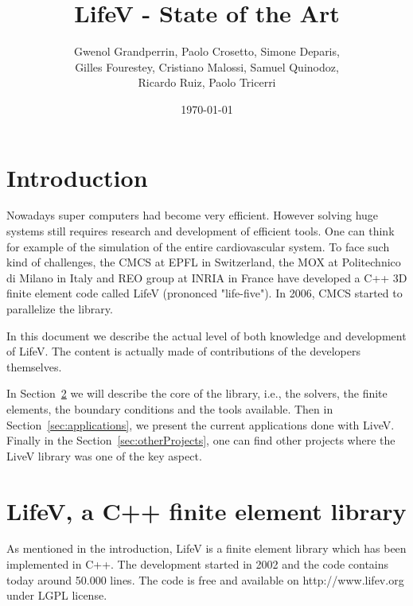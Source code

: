 \documentclass[11pt]{article}
\begin{document}
\title{LifeV - State of the Art}
\author{Gwenol Grandperrin, Paolo Crosetto, Simone Deparis,\\
	Gilles Fourestey, Cristiano Malossi, Samuel Quinodoz, \\
	Ricardo Ruiz, Paolo Tricerri}
\date{\today}
\maketitle
\tableofcontents

\section{Introduction}
Nowadays super computers had become very efficient. However solving huge systems still requires research and development of efficient tools. One can think for example of the simulation of the entire cardiovascular system. To face such kind of challenges, the CMCS at EPFL in Switzerland, the MOX at Politechnico di Milano in Italy and REO group at INRIA in France have developed a C++ 3D finite element code called LifeV (prononced "life-five"). In 2006, CMCS started to parallelize the library.

In this document we describe the actual level of both knowledge and development of LifeV. The content is actually made of contributions of the developers themselves.

In Section~\ref{sec:lifev} we will describe the core of the library, i.e., the solvers, the finite elements, the boundary conditions and the tools available. Then in Section~\ref{sec:applications}, we present the current applications done with LiveV. Finally in the Section~\ref{sec:otherProjects}, one can find other projects where the LiveV library was one of the key aspect.

\section{LifeV, a C++ finite element library}
\label{sec:lifev}

As mentioned in the introduction, LifeV is a finite element library which has been implemented in C++. The development started in 2002 and the code contains today around 50.000 lines. The code is free and available on http://www.lifev.org under LGPL license.
\end{document}
